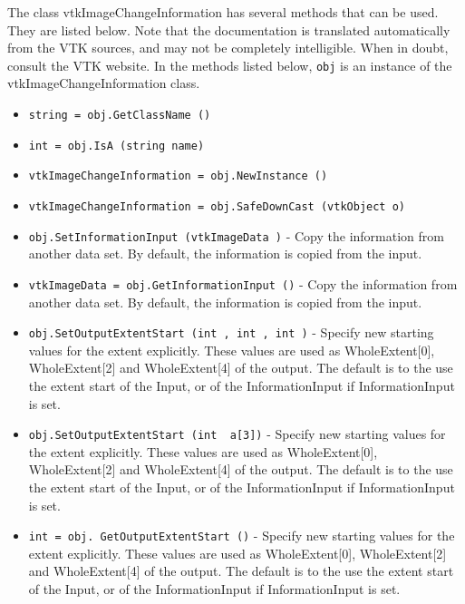 The class vtkImageChangeInformation has several methods that can be used.
  They are listed below.
Note that the documentation is translated automatically from the VTK sources,
and may not be completely intelligible.  When in doubt, consult the VTK website.
In the methods listed below, \verb|obj| is an instance of the vtkImageChangeInformation class.
\begin{itemize}
\item  \verb|string = obj.GetClassName ()|

\item  \verb|int = obj.IsA (string name)|

\item  \verb|vtkImageChangeInformation = obj.NewInstance ()|

\item  \verb|vtkImageChangeInformation = obj.SafeDownCast (vtkObject o)|

\item  \verb|obj.SetInformationInput (vtkImageData )| -  Copy the information from another data set.  By default,
 the information is copied from the input.

\item  \verb|vtkImageData = obj.GetInformationInput ()| -  Copy the information from another data set.  By default,
 the information is copied from the input.

\item  \verb|obj.SetOutputExtentStart (int , int , int )| -  Specify new starting values for the extent explicitly.
 These values are used as WholeExtent[0], WholeExtent[2] and
 WholeExtent[4] of the output.  The default is to the
 use the extent start of the Input, or of the InformationInput
 if InformationInput is set.

\item  \verb|obj.SetOutputExtentStart (int  a[3])| -  Specify new starting values for the extent explicitly.
 These values are used as WholeExtent[0], WholeExtent[2] and
 WholeExtent[4] of the output.  The default is to the
 use the extent start of the Input, or of the InformationInput
 if InformationInput is set.

\item  \verb|int = obj. GetOutputExtentStart ()| -  Specify new starting values for the extent explicitly.
 These values are used as WholeExtent[0], WholeExtent[2] and
 WholeExtent[4] of the output.  The default is to the
 use the extent start of the Input, or of the InformationInput
 if InformationInput is set.


\end{itemize}

